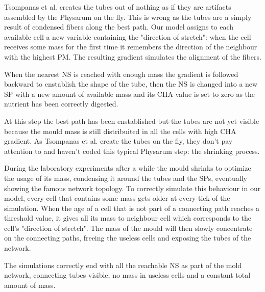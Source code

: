 \par
Tsompanas et al. \cite{Tsompanas2016} creates the tubes out of nothing as if they are artifacts assembled by the Physarum on the fly. This is wrong as the tubes are a simply result of condensed fibers along the best path. Our model assigns to each available cell a new variable containing the "direction of stretch": when the cell receives some mass for the first time it remembers the direction of the neighbour with the highest PM. The resulting gradient simulates the alignment of the fibers.

\par
When the nearest NS is reached with enough mass the gradient is followed backward to enstablish the shape of the tube, then the NS is changed into a new SP with a new amount of available mass and its CHA value is set to zero as the nutrient has been correctly digested.

\par
At this step the best path has been enstablished but the tubes are not yet visible because the mould mass is still distribuited in all the cells with high CHA gradient.
As Tsompanas et al. \cite{Tsompanas2016} create the tubes on the fly, they don't pay attention to and haven't coded this typical Physarum step: the shrinking process.

\par
During the laboratory experiments after a while the mould shrinks to optimize the usage of its mass, condensing it around the tubes and the SPs, eventually showing the famous network topology.
To correctly simulate this behaviour in our model, every cell that contains some mass gets older at every tick of the simulation. When the age of a cell that is not part of a connecting path reaches a threshold value, it gives all its mass to neighbour cell which corresponds to the cell's "direction of stretch". The mass of the mould will then slowly concentrate on the connecting paths, freeing the useless cells and exposing the tubes of the network.

\par
The simulations correctly end with all the reachable NS as part of the mold network, connecting tubes visible, no mass in useless cells and a constant total amount of mass.